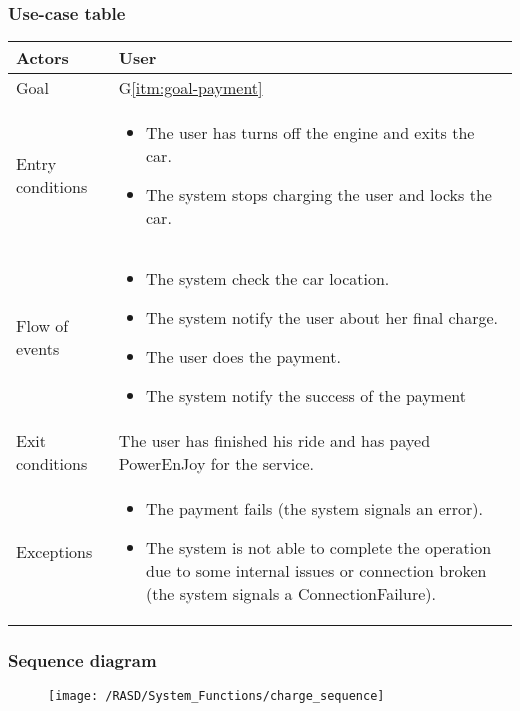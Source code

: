\subsubsection{Use-case table}
\begin{center}
  \begin{tabular}{ l | p{10cm} }
    \hline
    Actors & User\\ \hline
    Goal & G\ref{itm:goal-payment}\\ \hline
    Entry conditions & 
    \begin{itemize}
    \item The user has turns off the engine and exits the car.
    \item The system stops charging the user and locks the car.
    \end{itemize} \\ \hline
    Flow of events &
\begin{itemize}
\item The system check the car location.
\item The system notify the user about her final charge.
\item The user does the payment.
\item The system notify the success of the payment
\end{itemize} \\ \hline
    Exit conditions & The user has finished his ride and has payed PowerEnJoy for the service. \\ \hline
  Exceptions & 
\begin{itemize}
\item The payment fails (the system signals an error).
\item The system is not able to complete the operation due to some internal issues or connection broken (the system signals a ConnectionFailure).
\end{itemize} \\ \hline
  \end{tabular}
\end{center}


\newpage
\subsubsection{Sequence diagram}
\begin{figure}[!ht]
  \centering
  \vspace{0.1cm}
  \texttt{[image: /RASD/System\_Functions/charge\_sequence]}\\
  \vspace{0.1cm}
  \label{fig:charge_sequence} 
\end{figure}

